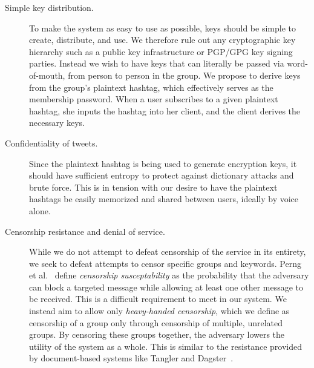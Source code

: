\begin{description}

\item[Simple key distribution.] To make the system as easy to use as
  possible, keys should be simple to create, distribute, and use. We
  therefore rule out any cryptographic key hierarchy such as a public
  key infrastructure or PGP/GPG key signing parties. Instead we wish
  to have keys that can literally be passed via
  word-of-mouth, from person to person in the group. We propose
  to derive keys from the group's plaintext hashtag, which effectively
  serves as the membership password. When a user subscribes to a given plaintext
  hashtag, she inputs the hashtag into her \hoot client, and the client
  derives the necessary keys.

\item[Confidentiality of tweets.] Since the plaintext hashtag is being
  used to generate encryption keys, it should have sufficient entropy to
  protect against dictionary attacks and brute force. This is in tension
  with our desire to have the plaintext hashtags be easily memorized and
  shared between users, ideally by voice alone.

\item[Censorship resistance and denial of service.] While we do not attempt
  to defeat censorship of the \hoot service in its entirety, we seek to
  defeat attempts to censor specific groups and keywords. Perng et
  al.~\cite{perng05revisited} define {\em censorship susceptability} as the probability that the
  adversary can block a targeted message while allowing at least one
  other message to be received. This is a
  difficult requirement to meet in our system. We instead aim to allow
  only {\em heavy-handed censorship}, which we define as censorship of a
  group only through censorship of multiple, unrelated groups. By
  censoring these groups together, the adversary lowers the utility of
  the system as a whole. This is similar to the resistance provided by
  document-based systems like Tangler and Dagster~\cite{tangler,dagster}.


\end{description}
